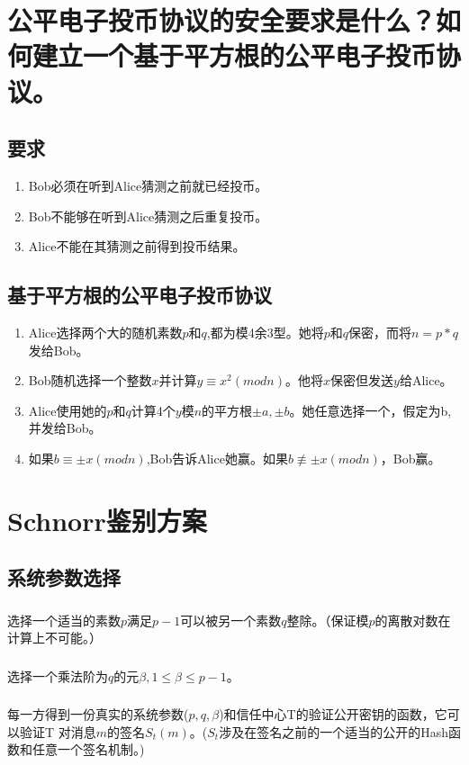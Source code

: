 \documentclass[11pt,a4paper]{article}
\begin{document}
\section{公平电子投币协议的安全要求是什么？如何建立一个基于平方根的公平电子投币协议。}

\subsection{要求}
\begin{enumerate}[(1)]
\item Bob必须在听到Alice猜测之前就已经投币。
\item Bob不能够在听到Alice猜测之后重复投币。
\item Alice不能在其猜测之前得到投币结果。
\end{enumerate}
\subsection{基于平方根的公平电子投币协议}
\begin{enumerate}
\item Alice选择两个大的随机素数$p$和$q$,都为模4余3型。她将$p$和$q$保密，而将$n=p*q$发给Bob。
\item Bob随机选择一个整数$x$并计算$y \equiv x^2(mod n)$。他将$x$保密但发送$y$给Alice。
\item Alice使用她的$p$和$q$计算4个$y$模$n$的平方根$\pm a,\pm b$。她任意选择一个，假定为b,并发给Bob。
\item 如果$b\equiv \pm x(mod n)$,Bob告诉Alice她赢。如果$b \not\equiv\pm x(mod n)$，Bob赢。
\end{enumerate}
\section{Schnorr鉴别方案}

\subsection{系统参数选择}
\subsubsection{}选择一个适当的素数$p$满足$p-1$可以被另一个素数$q$整除。（保证模$p$的离散对数在计算上不可能。）
\subsubsection{}选择一个乘法阶为$q$的元$\beta, 1\le \beta \le p-1$。
\subsubsection{}每一方得到一份真实的系统参数($p,q,\beta$)和信任中心T的验证公开密钥的函数，它可以验证T 对消息$m$的签名$S_t(m)$。($S_t$涉及在签名之前的一个适当的公开的Hash函数和任意一个签名机制。)
\end{document}
